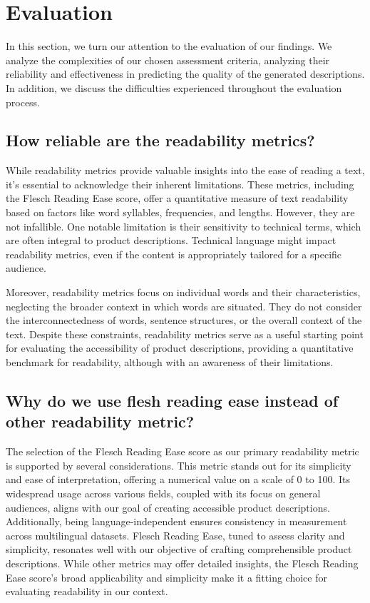 \section{Evaluation}

In this section, we turn our attention to the evaluation of our findings. We analyze the complexities of our chosen assessment criteria, analyzing their reliability and effectiveness in predicting the quality of the generated descriptions. In addition, we discuss the difficulties experienced throughout the evaluation process.

\subsection{How reliable are the readability metrics?}

While readability metrics provide valuable insights into the ease of reading a text, it's essential to acknowledge their inherent limitations. These metrics, including the Flesch Reading Ease score, offer a quantitative measure of text readability based on factors like word syllables, frequencies, and lengths. However, they are not infallible. One notable limitation is their sensitivity to technical terms, which are often integral to product descriptions. Technical language might impact readability metrics, even if the content is appropriately tailored for a specific audience.

Moreover, readability metrics focus on individual words and their characteristics, neglecting the broader context in which words are situated. They do not consider the interconnectedness of words, sentence structures, or the overall context of the text. Despite these constraints, readability metrics serve as a useful starting point for evaluating the accessibility of product descriptions, providing a quantitative benchmark for readability, although with an awareness of their limitations.

\subsection{Why do we use flesh reading ease instead of other readability metric?}
The selection of the Flesch Reading Ease score as our primary readability metric is supported by several considerations. This metric stands out for its simplicity and ease of interpretation, offering a numerical value on a scale of 0 to 100. Its widespread usage across various fields, coupled with its focus on general audiences, aligns with our goal of creating accessible product descriptions. Additionally, being language-independent ensures consistency in measurement across multilingual datasets. Flesch Reading Ease, tuned to assess clarity and simplicity, resonates well with our objective of crafting comprehensible product descriptions. While other metrics may offer detailed insights, the Flesch Reading Ease score's broad applicability and simplicity make it a fitting choice for evaluating readability in our context.

